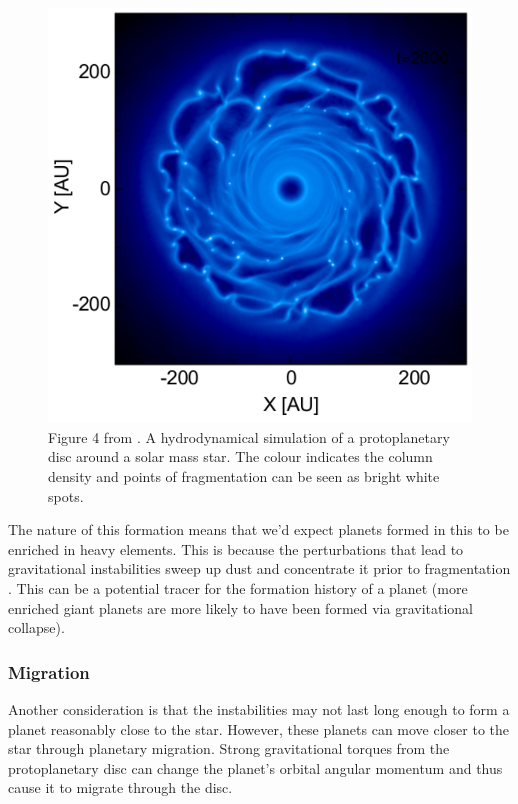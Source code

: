 \documentclass[twocolumn]{aastex631}
\begin{document}
\begin{figure}
    \centering
    \includegraphics[width=\columnwidth]{fragmentation.png}
    \caption{Figure 4 from \citet{Forgan+2017}. A hydrodynamical simulation of a protoplanetary disc around a solar mass star. The colour indicates the column density and points of fragmentation can be seen as bright white spots.}
    \label{fig:fragmentation}
\end{figure}

The nature of this formation means that we'd expect planets formed in this to be enriched in heavy elements. This is because the perturbations that lead to gravitational instabilities sweep up dust and concentrate it prior to fragmentation \citep{Kratter+2016}. This can be a potential tracer for the formation history of a planet (more enriched giant planets are more likely to have been formed via gravitational collapse).

\subsubsection{Migration}

Another consideration is that the instabilities may not last long enough to form a planet reasonably close to the star. However, these planets can move closer to the star through planetary migration. Strong gravitational torques from the protoplanetary disc can change the planet's orbital angular momentum and thus cause it to migrate through the disc.
\end{document}

